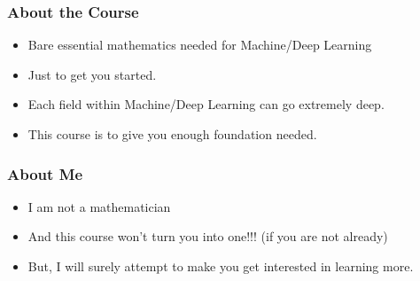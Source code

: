 \begin{frame}[fragile]\frametitle{About the Course}
\begin{itemize}
\item Bare essential mathematics needed for Machine/Deep Learning
\item Just to get you started.
\item Each field within Machine/Deep Learning can go extremely deep.
\item This course is to give you enough foundation needed.
\end{itemize}
\end{frame}

 \begin{frame}[fragile]\frametitle{About Me}
\begin{itemize}
\item I am not a mathematician
\item And this course won't turn you into one!!! (if you are not already)
\item But, I will surely attempt to make you get interested in learning more.
\end{itemize}
\end{frame}


